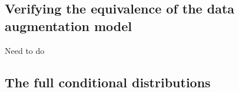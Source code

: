 \documentclass[11pt]{article}
\begin{document}

\subsection{Verifying the equivalence of the data augmentation model}

Need to do \vspace{2.54cm}





\subsection{The full conditional distributions}
\end{document}
